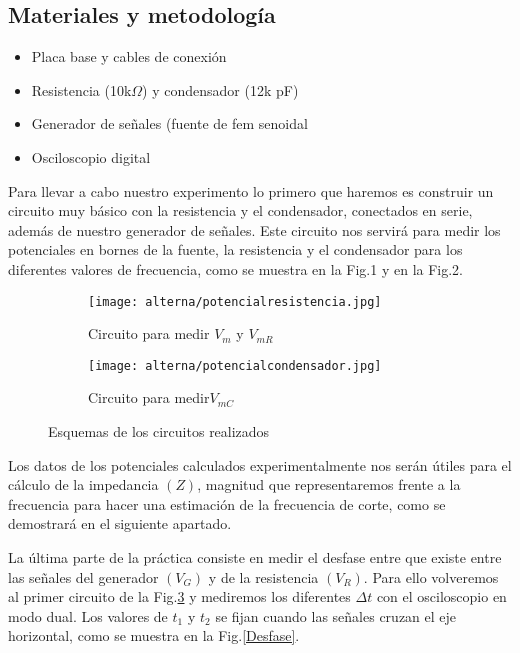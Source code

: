 \documentclass[a4paper,12pt,titlepage]{article}
\begin{document}
\subsection{Materiales y metodología}
\begin{itemize}
    \item Placa base y cables de conexión
    \item Resistencia (10k$\Omega$) y condensador (12k pF)
    \item Generador de señales (fuente de fem senoidal
    \item Osciloscopio digital
\end{itemize}

Para llevar a cabo nuestro experimento lo primero que haremos es construir un circuito muy básico con la resistencia y el condensador, conectados en serie, además de nuestro generador de señales. Este circuito nos servirá para medir los potenciales en bornes de la fuente, la resistencia y el condensador para los diferentes valores de frecuencia, como se muestra en la Fig.1 y en la Fig.2.


\begin{figure}[ht]
    \begin{subfigure}{0.5\textwidth}
        \texttt{[image: alterna/potencialresistencia.jpg]}
        \caption{Circuito para medir $V_{m}$ y $V_{mR}$}
        \label{Vm y Vmr}
    \end{subfigure}
    \begin{subfigure}{0.5\textwidth}
        \texttt{[image: alterna/potencialcondensador.jpg]}
        \caption{Circuito para medir$V_{mC}$}
        \label{Vmc}
    \end{subfigure}
\caption{Esquemas de los circuitos realizados}
\label{Esquemas circuitos}
\end{figure}

Los datos de los potenciales calculados experimentalmente nos serán útiles para el cálculo de la impedancia $(Z)$, magnitud que representaremos frente a la frecuencia para hacer una estimación de la frecuencia de corte, como se demostrará en el siguiente apartado.

\newpage
\par    %
La última parte de la práctica consiste en medir el desfase entre que existe entre las señales del generador $(V_{G})$ y de la resistencia $(V_{R})$. Para ello volveremos al primer circuito de la Fig.\ref{Esquemas circuitos} y mediremos los diferentes $\Delta t$ con el osciloscopio en modo dual. Los valores de $t_{1}$ y $t_{2}$ se fijan cuando las señales cruzan el eje horizontal, como se muestra en la Fig.\ref{Desfase}.
\end{document}
